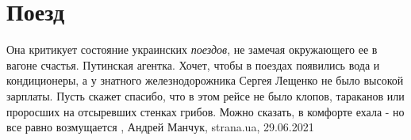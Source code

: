 
 
 
 
 
\chapter{Поезд}
\label{sec:slova.poezd}

Она критикует состояние украинских \emph{поездов}, не замечая окружающего ее в вагоне
счастья. Путинская агентка. Хочет, чтобы в поездах появились вода и
кондиционеры, а у знатного железнодорожника Сергея Лещенко не было высокой
зарплаты. Пусть скажет спасибо, что в этом рейсе не было клопов, тараканов или
проросших на отсыревших стенках грибов. Можно сказать, в комфорте ехала - но
все равно возмущается
, 
Андрей Манчук, strana.ua, 29.06.2021

